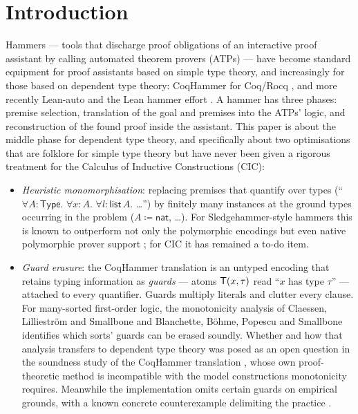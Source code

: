\section{Introduction}
\label{sec:intro}

Hammers --- tools that discharge proof obligations of an
interactive proof assistant by calling automated theorem provers
(ATPs) --- have become standard equipment for proof assistants
based on simple type theory, and increasingly for those based on
dependent type theory: CoqHammer for Coq/Rocq
\cite{CzajkaKaliszyk2018}, and more recently Lean-auto and the Lean
hammer effort \cite{QianEtAl2025,ZhuEtAl2025}.  A hammer has three
phases: premise selection, translation of the goal and premises
into the ATPs' logic, and reconstruction of the found proof inside
the assistant.  This paper is about the middle phase for dependent
type theory, and specifically about two optimisations that are
folklore for simple type theory but have never been given a
rigorous treatment for the Calculus of Inductive Constructions
(CIC):

\begin{itemize}
\item \emph{Heuristic monomorphisation}: replacing premises that
  quantify over types (``$\forall A{:}\mathsf{Type}$.
  $\forall x{:}A$. $\forall l{:}\mathsf{list}\,A$. \ldots'') by
  finitely many instances at the ground types occurring in the problem
  ($A \coloneqq \mathsf{nat}$, \ldots).  For Sledgehammer-style
  hammers this is known to outperform not only the polymorphic
  encodings but even native polymorphic prover support
  \cite{Blanchette2016,Desharnais2022}; for CIC it has remained a
  to-do item.
\item \emph{Guard erasure}: the CoqHammer translation is an untyped
  encoding that retains typing information as \emph{guards} ---
  atoms $\mathsf{T}(x, \tau)$ read ``$x$ has type $\tau$'' ---
  attached to every quantifier.  Guards multiply literals and
  clutter every clause.  For many-sorted first-order logic, the
  monotonicity analysis of Claessen, Lillieström and Smallbone
  \cite{Claessen2011} and Blanchette, B\"ohme, Popescu and
  Smallbone \cite{Blanchette2016} identifies which sorts' guards
  can be erased soundly.  Whether and how that analysis transfers
  to dependent type theory was posed as an open question in the
  soundness study of the CoqHammer translation
  \cite[\S6]{Czajka2016}, whose own proof-theoretic method is
  incompatible with the model constructions monotonicity requires.
  Meanwhile the implementation omits certain guards on empirical
  grounds, with a known concrete counterexample delimiting the
  practice \cite[\S5.6]{CzajkaKaliszyk2018}.
\end{itemize}

